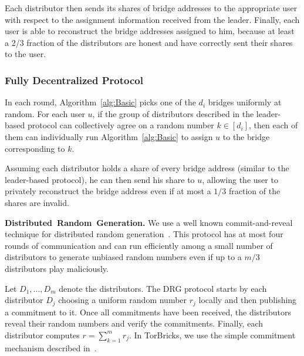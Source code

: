 \documentclass[letterpaper,twocolumn,10pt]{article}
\newcommand{\algFont}{\fontsize{10}{13}\selectfont}
\newcommand{\bricks}{}
\def\bricks/{\mbox{TorBricks}}
\newcommand{\sfsize}{\fontsize{0.68\baselineskip}{0.68\baselineskip}\selectfont}
\newcommand{\sans}[1]{\textbf{\textsf{\sfsize \mbox{#1}}}}
\newcommand{\para}[1]{\vspace{0.55em} \noindent \sans{{\mbox{#1}}}}
\begin{document}
Each distributor then sends its shares of bridge addresses to the appropriate user with respect to the assignment information received from the leader. Finally, each user is able to reconstruct the bridge addresses assigned to him, because at least a 2/3 fraction of the distributors are honest and have correctly sent their shares to the user.
%	

\subsubsection{Fully Decentralized Protocol} \label{sec:decentralized-alg}
In each round, Algorithm~\ref{alg:Basic} picks one of the $d_i$ bridges uniformly at random. For each user $u$, if the group of distributors described in the leader-based protocol can collectively agree on a random number ${k \in [d_i]}$, then each of them can individually run Algorithm~\ref{alg:Basic} to assign $u$ to the bridge corresponding to $k$. 

Assuming each distributor holds a share of every bridge address (similar to the leader-based protocol), he can then send his share to $u$, allowing the user to privately reconstruct the bridge address even if at most a $1/3$ fraction of the shares are invalid.

\para{Distributed Random Generation.} 
We use a well known commit-and-reveal technique for distributed random generation~\cite{cryptoeprint:2015:366, Tor:DRG:Proposal:2015}. This protocol has at most four rounds of communication and can run efficiently among a small number of distributors to generate unbiased random numbers even if up to a $m/3$ distributors play maliciously.

Let $D_1,...,D_m$ denote the distributors. The DRG protocol starts by each distributor $D_j$ choosing a uniform random number $r_j$ locally and then publishing a commitment to it. Once all commitments have been received, the distributors reveal their random numbers and verify the commitments. Finally, each distributor computes $r = \sum_{k=1}^m{r_j}$. In \bricks/, we use the simple commitment mechanism described in~\cite{Tor:DRG:Proposal:2015}.
\end{document}
